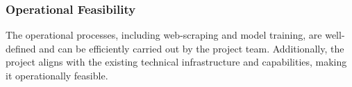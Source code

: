             \subsubsection{Operational Feasibility}
                The operational processes, including web-scraping and model training, are well-defined and can be efficiently carried out by the project team. Additionally, the project aligns with the existing technical infrastructure and capabilities, making it operationally feasible.
